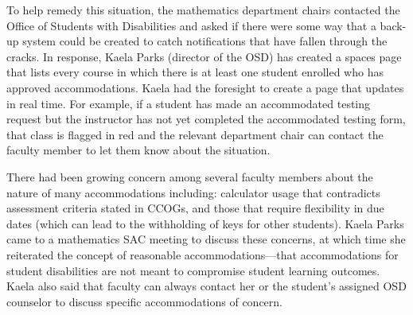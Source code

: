 To help remedy this situation, the mathematics department chairs contacted the
Office of Students with Disabilities and asked if there were some way that a
back-up system could be created to catch notifications that have fallen through
the cracks.  In response, Kaela Parks (director of the OSD) has created a
spaces page that lists every course in which there is at least one student
enrolled who has approved accommodations.  Kaela had the foresight to create a
page that updates in real time.  For example, if a student has made an
accommodated testing request but the instructor has not yet completed the
accommodated testing form, that class is flagged in red and the relevant
department chair can contact the faculty member to let them know about the
situation.

There had been growing concern among several faculty members
about the nature of many accommodations including:  calculator usage that
contradicts assessment criteria stated in CCOGs, and  those that require flexibility
in due dates (which can lead to the withholding of keys for other students).  Kaela Parks came to a mathematics SAC
meeting to discuss these concerns, at which time she reiterated the concept of
reasonable accommodations---that accommodations for student disabilities are not
meant to compromise student learning outcomes.
Kaela also said that
faculty can always contact her or the student's assigned OSD counselor to
discuss specific accommodations of concern.

